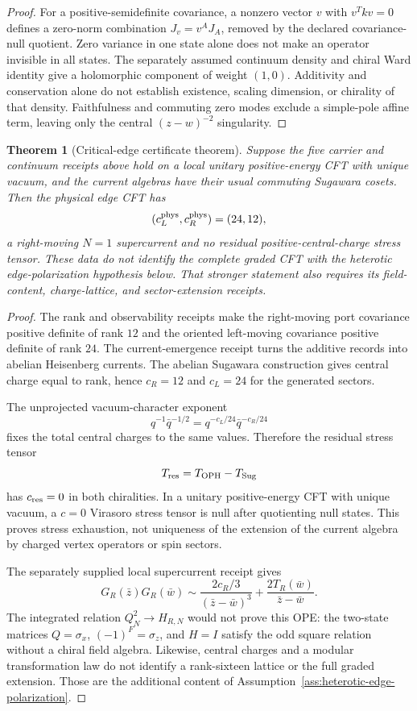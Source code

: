 \documentclass[11pt]{article}
\newtheorem{theorem}{Theorem}[section]
\theoremstyle{remark}
\theoremstyle{plain}
\newcommand{\OPH}{\mathrm{OPH}}
\begin{document}
\begin{proof}
For a positive-semidefinite covariance, a nonzero vector \(v\) with \(v^Tkv=0\) defines a zero-norm
combination \(J_v=v^AJ_A\), removed by the declared covariance-null
quotient. Zero variance in one state alone does not make an operator
invisible in all states. The separately assumed continuum density and
chiral Ward identity give a holomorphic component of weight \((1,0)\).
Additivity and conservation alone do not establish existence, scaling
dimension, or chirality of that density. Faithfulness and commuting zero
modes exclude a simple-pole affine term, leaving only
the central \((z-w)^{-2}\) singularity.
\end{proof}

\begin{theorem}[Critical-edge certificate theorem]
Suppose the five carrier and continuum receipts above hold on a local
unitary positive-energy CFT with unique vacuum, and the current algebras
have their usual commuting Sugawara cosets. Then the physical edge CFT has
\[
(c_L^{\rm phys},c_R^{\rm phys})=(24,12),
\]
a right-moving \(N=1\) supercurrent and no residual positive-central-charge
stress tensor. These data do not identify the complete graded CFT with the
heterotic edge-polarization hypothesis below. That stronger statement also
requires its field-content, charge-lattice, and sector-extension receipts.
\end{theorem}

\begin{proof}
The rank and observability receipts make the right-moving port covariance positive definite of
rank \(12\) and the oriented left-moving covariance positive definite of rank \(24\). The
current-emergence receipt turns the additive records into abelian Heisenberg currents. The abelian
Sugawara construction gives central charge equal to rank, hence \(c_R=12\) and \(c_L=24\) for the
generated sectors.

The unprojected vacuum-character exponent
\[
q^{-1}\bar q^{-1/2}=q^{-c_L/24}\bar q^{-c_R/24}
\]
fixes the total central charges to the same values. Therefore the residual stress tensor
\[
T_{\rm res}=T_{\OPH}-T_{\rm Sug}
\]
has \(c_{\rm res}=0\) in both chiralities. In a unitary positive-energy CFT with unique vacuum, a
\(c=0\) Virasoro stress tensor is null after quotienting null states. This
proves stress exhaustion, not uniqueness of the extension of the current
algebra by charged vertex operators or spin sectors.

The separately supplied local supercurrent receipt gives
\[
G_R(\bar z)G_R(\bar w)
\sim
\frac{2c_R/3}{(\bar z-\bar w)^3}
+
\frac{2T_R(\bar w)}{\bar z-\bar w}.
\]
The integrated relation \(Q_N^2\to H_{R,N}\) would not prove this OPE:
the two-state matrices \(Q=\sigma_x\), \((-1)^F=\sigma_z\), and \(H=I\)
satisfy the odd square relation without a chiral field algebra.
Likewise, central charges and a modular transformation law do not identify
a rank-sixteen lattice or the full graded extension. Those are the
additional content of Assumption~\ref{ass:heterotic-edge-polarization}.
\end{proof}
\end{document}
